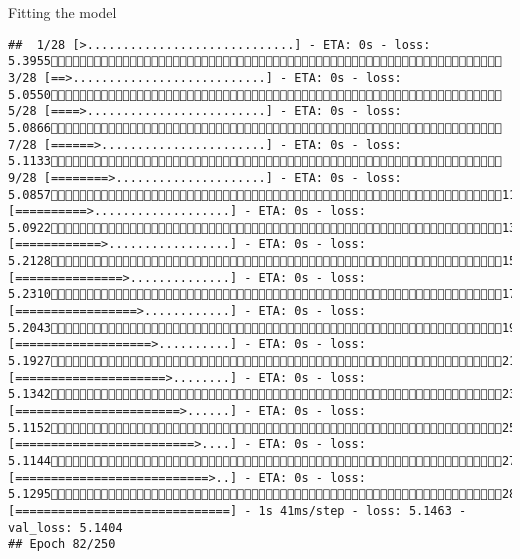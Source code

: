 \documentclass[
  ignorenonframetext,
]{beamer}
\begin{document}
\begin{frame}[fragile]{Fitting the model}
\begin{verbatim}
##  1/28 [>.............................] - ETA: 0s - loss: 5.3955 3/28 [==>...........................] - ETA: 0s - loss: 5.0550 5/28 [====>.........................] - ETA: 0s - loss: 5.0866 7/28 [======>.......................] - ETA: 0s - loss: 5.1133 9/28 [========>.....................] - ETA: 0s - loss: 5.085711/28 [==========>...................] - ETA: 0s - loss: 5.092213/28 [============>.................] - ETA: 0s - loss: 5.212815/28 [===============>..............] - ETA: 0s - loss: 5.231017/28 [=================>............] - ETA: 0s - loss: 5.204319/28 [===================>..........] - ETA: 0s - loss: 5.192721/28 [=====================>........] - ETA: 0s - loss: 5.134223/28 [=======================>......] - ETA: 0s - loss: 5.115225/28 [=========================>....] - ETA: 0s - loss: 5.114427/28 [===========================>..] - ETA: 0s - loss: 5.129528/28 [==============================] - 1s 41ms/step - loss: 5.1463 - val_loss: 5.1404
## Epoch 82/250

\end{verbatim}
\end{frame}
\end{document}

